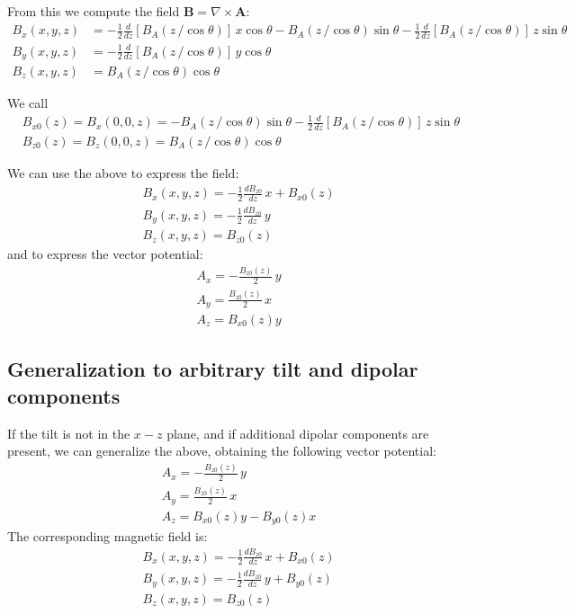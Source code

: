 From this we compute the field $\mathbf{B} = \nabla \times \mathbf{A}$:
\begin{align}
B_x(x,y,z) &= -\frac{1}{2} \frac{d}{dz} \left[B_A(z\,/\cos \theta)\right]\, x \cos\theta - B_A(z\,/\cos \theta) \sin\theta - \frac{1}{2}  \frac{d}{dz} \left[B_A(z\,/\cos \theta)\right] \, z \sin\theta  \\
B_y(x,y,z) &= -\frac{1}{2}  \frac{d}{dz} \left[B_A(z\,/\cos \theta)\right] \, y \cos\theta \\
B_z(x,y,z) &= B_A(z\,/\cos \theta) \cos\theta
\end{align}

We call
\begin{align}
&\boxed{B_{x0}(z) = B_x(0,0,z) = -B_A(z\,/\cos \theta) \sin\theta - \frac{1}{2} \frac{d}{dz} \left[B_A(z\,/\cos \theta)\right] \, z \sin\theta }\\
&\boxed{B_{z0}(z) = B_z(0,0,z) = B_A(z\,/\cos \theta) \cos\theta}
\end{align}

We can use the above to express the field:
\begin{align}
&\boxed{B_x(x,y,z) = -\frac{1}{2} \frac{dB_{z0}}{dz} \, x  + B_{x0}(z)} \\
&\boxed{B_y(x,y,z) = -\frac{1}{2} \frac{dB_{z0}}{dz} \, y} \\
&\boxed{B_z(x,y,z) = B_{z0}(z)}
\end{align}
and to express the vector potential:
\begin{align}
&\boxed{A_x = -\frac{B_{z0}(z)}{2} \, y}\\
&\boxed{A_y = \frac{B_{z0}(z)}{2} \, x}\\
&\boxed{A_z = B_{x0}(z) y}
\end{align}

\subsection{Generalization to arbitrary tilt and dipolar components}

If the tilt is not in the $x-z$ plane, and if additional dipolar components are present,
we can generalize the above, obtaining the following vector potential:
\begin{align}
&\boxed{A_x = -\frac{B_{z0}(z)}{2} \, y}\\
&\boxed{A_y = \frac{B_{z0}(z)}{2} \, x}\\
&\boxed{A_z = B_{x0}(z) y - B_{y0}(z) x}
\end{align}
The corresponding magnetic field is:
\begin{align}
&\boxed{B_x(x,y,z) = -\frac{1}{2} \frac{dB_{z0}}{dz} \, x  + B_{x0}(z)} \\
&\boxed{B_y(x,y,z) = -\frac{1}{2} \frac{dB_{z0}}{dz} \, y + B_{y0}(z)} \\
&\boxed{B_z(x,y,z) = B_{z0}(z)}
\end{align}

